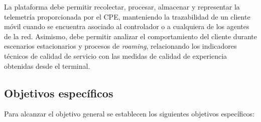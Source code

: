 La plataforma debe permitir recolectar, procesar, almacenar y representar
la telemetría proporcionada por el CPE, manteniendo la trazabilidad de un
cliente móvil cuando se encuentra asociado al controlador o a cualquiera
de los agentes de la red. Asimismo, debe permitir analizar el
comportamiento del cliente durante escenarios estacionarios y procesos de
\textit{roaming}, relacionando los indicadores técnicos de calidad de
servicio con las medidas de calidad de experiencia obtenidas desde el
terminal.

\subsection{Objetivos específicos}
\label{subsec:objetivos-especificos}

Para alcanzar el objetivo general se establecen los siguientes objetivos
específicos:

